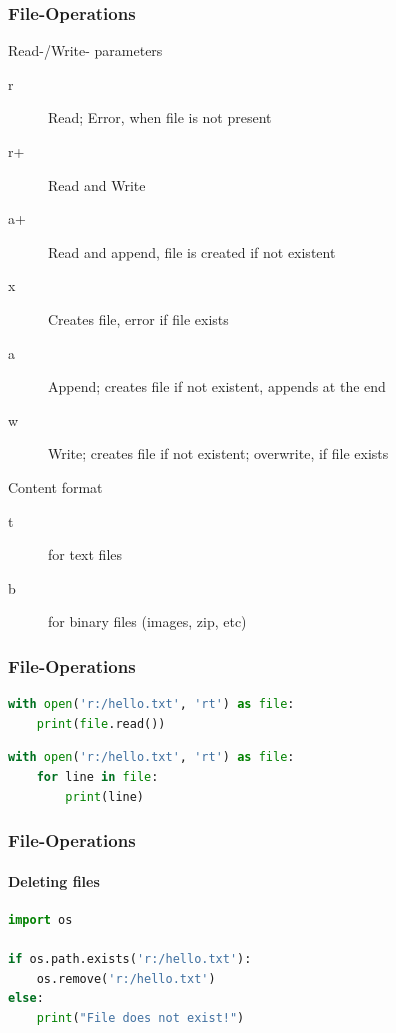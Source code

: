 \documentclass[english]{beamer}
\begin{document}
\begin{frame}[containsverbatim]
\frametitle{File-Operations}

Read-/Write- parameters

\begin{description}
\item [r] Read; Error, when file is not present
\item [r+] Read and Write
\item [a+] Read and append, file is created if not existent
\item [x] Creates file, error if file exists
\item [a] Append; creates file if not existent, appends at the end
\item [w] Write; creates file if not existent; overwrite, if file exists
\end{description}

Content format

\begin{description}
\item[t] for text files
\item[b] for binary files (images, zip, etc)
\end{description}

\end{frame}

\begin{frame}[containsverbatim]
\frametitle{File-Operations}

\begin{lstlisting}[language=Python,caption={Read a complete file}]
with open('r:/hello.txt', 'rt') as file:  
    print(file.read())
\end{lstlisting}

\begin{lstlisting}[language=Python,caption={Row-wise reading a file}]
with open('r:/hello.txt', 'rt') as file:  
    for line in file:
        print(line)
\end{lstlisting}

\end{frame}



\begin{frame}[containsverbatim]
\frametitle{File-Operations}
\framesubtitle{Deleting files}

\begin{lstlisting}[language=Python,caption={Deleting a file}]
import os

if os.path.exists('r:/hello.txt'):
    os.remove('r:/hello.txt')
else:
    print("File does not exist!")   
\end{lstlisting}

\end{frame}
\end{document}
